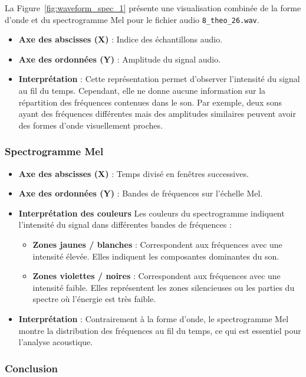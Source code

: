 La Figure~\ref{fig:waveform_spec_1} présente une visualisation combinée de la forme d’onde et du spectrogramme Mel pour le fichier audio \texttt{8\_theo\_26.wav}.

\begin{itemize}
    \item \textbf{Axe des abscisses (X)} : Indice des échantillons audio.
    \item \textbf{Axe des ordonnées (Y)} : Amplitude du signal audio.
    \item \textbf{Interprétation} : Cette représentation permet d'observer l'intensité du signal au fil du temps. Cependant, elle ne donne aucune information sur la répartition des fréquences contenues dans le son. Par exemple, deux sons ayant des fréquences différentes mais des amplitudes similaires peuvent avoir des formes d’onde visuellement proches.
\end{itemize}

\subsubsection{Spectrogramme Mel}
\begin{itemize}
    \item \textbf{Axe des abscisses (X)} : Temps divisé en fenêtres successives.
    \item \textbf{Axe des ordonnées (Y)} : Bandes de fréquences sur l’échelle Mel.
    \item \textbf{Interprétation des couleurs}
    Les couleurs du spectrogramme indiquent l'intensité du signal dans différentes bandes de fréquences :
    \begin{itemize}
        \item \textbf{Zones jaunes / blanches} : Correspondent aux fréquences avec une intensité élevée. Elles indiquent les composantes dominantes du son.
        \item \textbf{Zones violettes / noires} : Correspondent aux fréquences avec une intensité faible. Elles représentent les zones silencieuses ou les parties du spectre où l’énergie est très faible.
    \end{itemize}
    \item \textbf{Interprétation} : Contrairement à la forme d’onde, le spectrogramme Mel montre la distribution des fréquences au fil du temps, ce qui est essentiel pour l’analyse acoustique.
\end{itemize}

\subsubsection{Conclusion}

